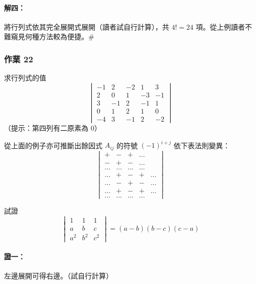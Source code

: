 \paragraph{解四：}將行列式依其完全展開式展開（讀者試自行計算），共 $4! = 24$ 項。從上例讀者不難窺見何種方法較為便捷。\hfill$\#$

\subsubsection*{作業 22}\label{hw:b6s-1-22}
求行列式的值
\[ \begin{vmatrix}
-1 & 2 & -2 & 1 & 3 \\
2 & 0 & 1 & -3 & -1 \\
3 & -1 & 2 & -1 & 1 \\
0 & 1 & 2 & 1 & 0 \\
-4 & 3 & -1 & 2 & -2
\end{vmatrix} \]
（提示：第四列有二原素為 0）

從上面的例子亦可推斷出餘因式 $A_{ij}$ 的符號 $(-1)^{i+j}$ 依下表法則變異：
\begin{equation}
\begin{vmatrix}
+ & - & + & \dots \\
- & + & - & \dots \\
\dots & \dots & \dots & \dots \\
\dots & + & - & + & \dots \\
\dots & - & + & - & \dots \\
\dots & + & - & + & \dots \\
\dots & \dots & \dots & \dots
\end{vmatrix} \label{eq:b6s-1-6-19}
\end{equation}

\begin{example}\label{ex:b6s-1-30}
試證
\[ \begin{vmatrix}
1 & 1 & 1 \\
a & b & c \\
a^2 & b^2 & c^2
\end{vmatrix} = (a-b)(b-c)(c-a) \]
\end{example}

\paragraph{證一：}左邊展開可得右邊。（試自行計算）

